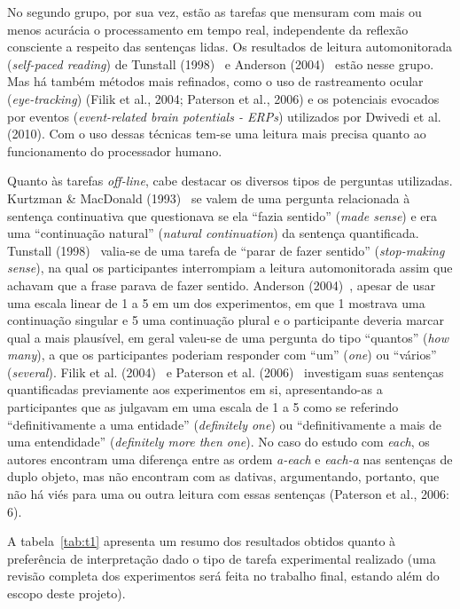 No segundo grupo, por sua vez, estão as tarefas que mensuram com mais ou menos acurácia o processamento em tempo real, independente da reflexão consciente a respeito das sentenças lidas. Os resultados de leitura automonitorada (\emph{self-paced reading}) de Tunstall (1998)~\cite{Tunstall1998} e Anderson (2004)~\cite{Anderson2004} estão nesse grupo. Mas há também métodos mais refinados, como o uso de rastreamento ocular (\emph{eye-tracking}) (Filik et al., 2004; Paterson et al., 2006) e os potenciais evocados por eventos (\emph{event-related brain potentials - ERPs}) utilizados por Dwivedi et al. (2010). Com o uso dessas técnicas tem-se uma leitura mais precisa quanto ao funcionamento do processador humano.

Quanto às tarefas \emph{off-line}, cabe destacar os diversos tipos de perguntas utilizadas. Kurtzman \& MacDonald (1993)~\cite{KMac1993} se valem de uma pergunta relacionada à sentença continuativa que questionava se ela ``fazia sentido'' (\emph{made sense}) e era uma ``continuação natural'' (\emph{natural continuation}) da sentença quantificada. Tunstall (1998)~\cite{Tunstall1998} valia-se de uma tarefa de ``parar de fazer sentido'' (\emph{stop-making sense}), na qual os participantes interrompiam a leitura automonitorada assim que achavam que a frase parava de fazer sentido. Anderson (2004)~\cite{Anderson2004}, apesar de usar uma escala linear de 1 a 5 em um dos experimentos, em que 1 mostrava uma continuação singular e 5 uma continuação plural e o participante deveria marcar qual a mais plausível, em geral valeu-se de uma pergunta do tipo ``quantos'' (\emph{how many}), a que os participantes poderiam responder com ``um'' (\emph{one}) ou ``vários'' (\emph{several}). Filik et al. (2004)~\cite{filik2004} e Paterson et al. (2006)~\cite{paterson2007} investigam suas sentenças quantificadas previamente aos experimentos em si, apresentando-as a participantes que as julgavam em uma escala de 1 a 5 como se referindo ``definitivamente a uma entidade'' (\emph{definitely one}) ou ``definitivamente a mais de uma entendidade'' (\emph{definitely more then one}). No caso do estudo com \emph{each}, os autores encontram uma diferença entre as ordem \emph{a-each} e \emph{each-a} nas sentenças de duplo objeto, mas não encontram com as dativas, argumentando, portanto, que não há viés para uma ou outra leitura com essas sentenças (Paterson et al., 2006: 6).

A tabela~\ref{tab:t1} apresenta um resumo dos resultados obtidos quanto à preferência de interpretação dado o tipo de tarefa experimental realizado (uma revisão completa dos experimentos será feita no trabalho final, estando além do escopo deste projeto).

